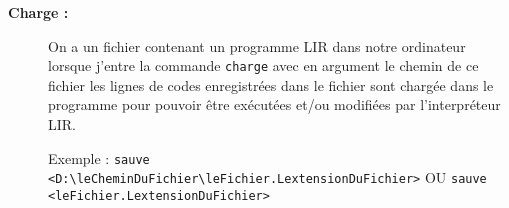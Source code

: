 \begin{description}
	
	
	\item[\textbf{Charge :}] On a un fichier contenant un programme LIR dans notre ordinateur lorsque j'entre la commande \verb|charge| avec en argument le chemin de ce fichier les lignes de codes enregistrées dans le fichier sont chargée dans le
	programme pour pouvoir être exécutées et/ou modifiées par l'interpréteur LIR.
	
	Exemple : \verb|sauve <D:\leCheminDuFichier\leFichier.LextensionDuFichier>| OU \verb|sauve <leFichier.LextensionDuFichier>|
	
\end{description} 